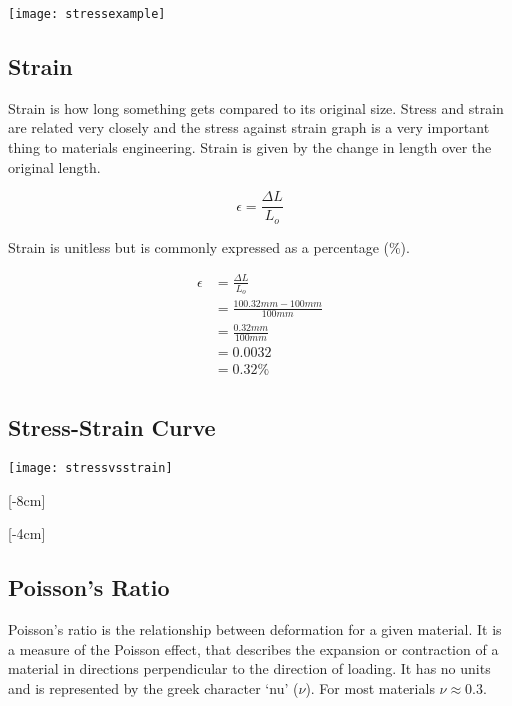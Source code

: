 \documentclass[12pt]{article}
\begin{document}
\begin{marginfigure}
  \vspace{-8cm}
  \texttt{[image: stressexample]}
\end{marginfigure}

\subsection{Strain}
Strain is how long something gets compared to its original size.
Stress and strain are related very closely and the stress against strain graph is a very important thing to materials engineering.
Strain is given by the change in length over the original length.

\begin{equation*}
  \epsilon = \frac{\Delta L}{L_o} 
\end{equation*}  

Strain is unitless but is commonly expressed as a percentage (\%).

\begin{example}
  \begin{align*}
    \epsilon &= \frac{\Delta L}{L_o} \\
             &= \frac{100.32\unit{mm}-100\unit{mm}}{100\unit{mm}} \\ 
            &= \frac{0.32\unit{mm}}{100\unit{mm}} \\ 
            &= 0.0032 \\
            &= 0.32\% \\ 
  \end{align*}
\end{example}

\subsection{Stress-Strain Curve}
\texttt{[image: stressvsstrain]}

[-8cm]

[-4cm]

\subsection{Poisson's Ratio}
Poisson's ratio is the relationship between deformation for a given material. 
It is a measure of the Poisson effect, that describes the expansion or contraction of a material in directions perpendicular to the direction of loading. 
It has no units and is represented by the greek character `nu' ($\nu$).
For most materials $\nu \approx 0.3$.
\end{document}
